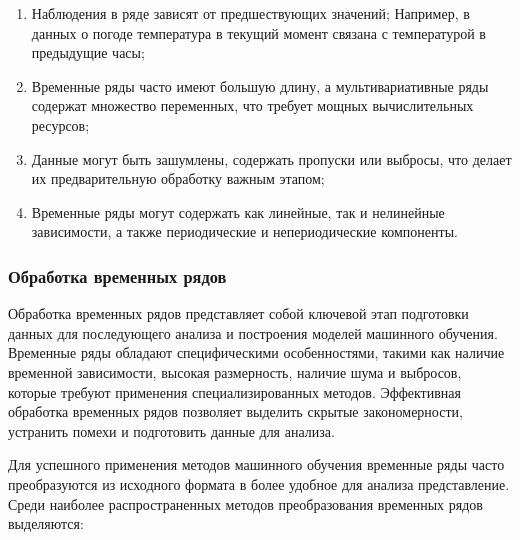 \documentclass[spec, och, diploma]{SCWorks}
\begin{document}
            \begin{enumerate}
                \item Наблюдения в ряде зависят от предшествующих значений;
                Например, в данных о погоде температура в текущий момент связана с
                температурой в предыдущие часы;
                \item Временные ряды часто имеют большую длину, а мультивариативные
                ряды содержат множество переменных, что требует мощных
                вычислительных ресурсов;
                \item Данные могут быть зашумлены, содержать пропуски или выбросы,
                что делает их предварительную обработку важным этапом;
                \item Временные ряды могут содержать как линейные, так и нелинейные
                зависимости, а также периодические и непериодические компоненты.
            \end{enumerate}

        \subsubsection{Обработка временных рядов}

            Обработка временных рядов представляет собой ключевой этап
            подготовки данных для последующего анализа и построения моделей
            машинного обучения. Временные ряды обладают специфическими
            особенностями, такими как наличие временной зависимости, высокая
            размерность, наличие шума и выбросов, которые требуют применения
            специализированных методов. Эффективная обработка временных рядов
            позволяет выделить скрытые закономерности, устранить помехи и
            подготовить данные для анализа.

            Для успешного применения методов машинного обучения временные ряды
            часто преобразуются из исходного формата в более удобное для анализа
            представление. Среди наиболее распространенных методов
            преобразования временных рядов выделяются:
\end{document}
